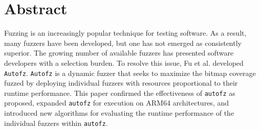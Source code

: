 \section{Abstract}
Fuzzing is an increasingly popular technique for testing software. As a result, 
many fuzzers have been developed, but one has not emerged as consistently superior. 
The growing number of available fuzzers has presented software developers with a 
selection burden.  To resolve this issue, Fu et al. developed \texttt{Autofz}. 
\texttt{Autofz} is a dynamic fuzzer that seeks to maximize the bitmap coverage fuzzed
 by deploying individual fuzzers with resources proportional to their runtime 
 performance. This paper confirmed the effectiveness of \texttt{autofz} as proposed, 
 expanded \texttt{autofz} for execution on ARM64 architectures, and introduced new
 algorithms for evaluating the runtime performance of the individual fuzzers within 
 \texttt{autofz}.